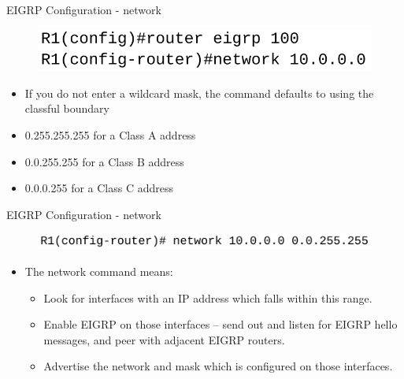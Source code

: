\documentclass[pdflatex,compress,mathserif]{beamer}
\begin{document}
\begin{frame}{EIGRP Configuration - network}
	\begin{figure}
		\centering
		\includegraphics[width=0.8\linewidth]{img/img12}
	\end{figure}
	\begin{itemize}
		\item If you do not enter a wildcard mask, the command defaults to
using the classful boundary
		\item 0.255.255.255 for a Class A address
		\item 0.0.255.255 for a Class B address
		\item 0.0.0.255 for a Class C address
	\end{itemize}
\end{frame}

\begin{frame}{EIGRP Configuration - network}
	\begin{figure}
		\centering
		\includegraphics[width=\linewidth]{img/img13}
	\end{figure}
	\begin{itemize}
		\item The network command means:
		\begin{itemize}
			\item Look for interfaces with an IP address which falls within this
range.
			\item Enable EIGRP on those interfaces – send out and listen for
EIGRP hello messages, and peer with adjacent EIGRP
routers.
			\item Advertise the network and mask which is configured on
those interfaces.
		\end{itemize}
	\end{itemize}
\end{frame}
\end{document}
